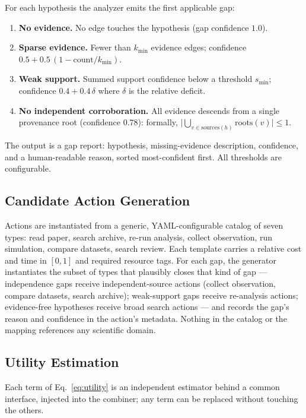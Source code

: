 \documentclass[11pt]{article}
\begin{document}
For each hypothesis the analyzer emits the first applicable gap:

\begin{enumerate}
  \item \textbf{No evidence.} No edge touches the hypothesis
  (gap confidence $1.0$).
  \item \textbf{Sparse evidence.} Fewer than $k_{\min}$ evidence edges;
  confidence $0.5 + 0.5\,(1 - \mathrm{count}/k_{\min})$.
  \item \textbf{Weak support.} Summed support confidence below a
  threshold $s_{\min}$; confidence $0.4 + 0.4\,\delta$ where $\delta$ is
  the relative deficit.
  \item \textbf{No independent corroboration.} All evidence descends from
  a single provenance root (confidence $0.78$): formally,
  $\big|\bigcup_{v \in \mathrm{sources}(h)} \mathrm{roots}(v)\big| \le 1$.
\end{enumerate}

The output is a gap report: hypothesis, missing-evidence description,
confidence, and a human-readable reason, sorted most-confident first. All
thresholds are configurable.

\subsection{Candidate Action Generation}

Actions are instantiated from a generic, YAML-configurable catalog of
seven types: read paper, search archive, re-run analysis, collect
observation, run simulation, compare datasets, search review. Each
template carries a relative cost and time in $[0,1]$ and required
resource tags. For each gap, the generator instantiates the subset of
types that plausibly closes that kind of gap --- independence gaps
receive independent-source actions (collect observation, compare
datasets, search archive); weak-support gaps receive re-analysis actions;
evidence-free hypotheses receive broad search actions --- and records the
gap's reason and confidence in the action's metadata. Nothing in the
catalog or the mapping references any scientific domain.

\subsection{Utility Estimation}
\label{sec:utility}

Each term of Eq.~\eqref{eq:utility} is an independent estimator behind a
common interface, injected into the combiner; any term can be replaced
without touching the others.
\end{document}
